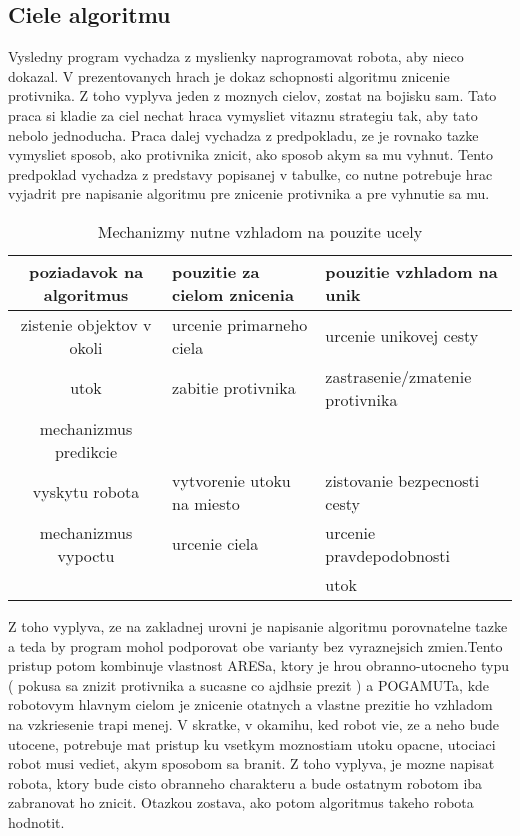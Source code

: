 \documentclass[a4paper,11pt,final]{report}
\begin{document}
\subsection{Ciele algoritmu}
Vysledny program vychadza z myslienky naprogramovat robota, aby nieco dokazal. V prezentovanych hrach je dokaz schopnosti algoritmu znicenie protivnika. Z toho vyplyva jeden z moznych cielov, zostat na bojisku sam. Tato praca si kladie za ciel nechat hraca vymysliet vitaznu strategiu tak, aby tato nebolo jednoducha. Praca dalej vychadza z predpokladu, ze je rovnako tazke vymysliet sposob, ako protivnika znicit, ako sposob akym sa mu vyhnut. Tento predpoklad vychadza z predstavy popisanej v tabulke, co nutne potrebuje hrac vyjadrit pre napisanie algoritmu pre znicenie protivnika a pre vyhnutie sa mu.\\
\begin{table}
\centering
\caption { Mechanizmy nutne vzhladom na pouzite ucely }
\begin{tabular}{|cll|}
\hline
poziadavok na algoritmus & pouzitie za cielom znicenia & pouzitie vzhladom na unik\\
\hline
zistenie objektov v okoli & urcenie primarneho ciela & urcenie unikovej cesty\\
utok & zabitie protivnika & zastrasenie/zmatenie protivnika\\
mechanizmus predikcie &&\\
vyskytu robota& vytvorenie utoku na miesto & zistovanie bezpecnosti cesty\\
mechanizmus vypoctu & urcenie ciela & urcenie pravdepodobnosti \\
&&utok\\
\hline
\end{tabular}
\end{table}
Z toho vyplyva, ze na zakladnej urovni je napisanie algoritmu porovnatelne tazke a teda by program mohol podporovat obe varianty bez vyraznejsich zmien.Tento pristup potom kombinuje vlastnost ARESa, ktory je hrou obranno-utocneho typu ( pokusa sa znizit protivnika a sucasne co ajdhsie prezit ) a POGAMUTa, kde robotovym hlavnym cielom je znicenie otatnych a vlastne prezitie ho vzhladom na vzkriesenie trapi menej. V skratke, v okamihu, ked robot vie, ze a neho bude utocene, potrebuje mat pristup ku vsetkym moznostiam utoku  opacne, utociaci robot musi vediet, akym sposobom sa branit. Z toho vyplyva, je mozne napisat robota, ktory bude cisto obranneho charakteru a bude ostatnym robotom iba zabranovat ho znicit. Otazkou zostava, ako potom algoritmus takeho robota hodnotit.\\
\end{document}
